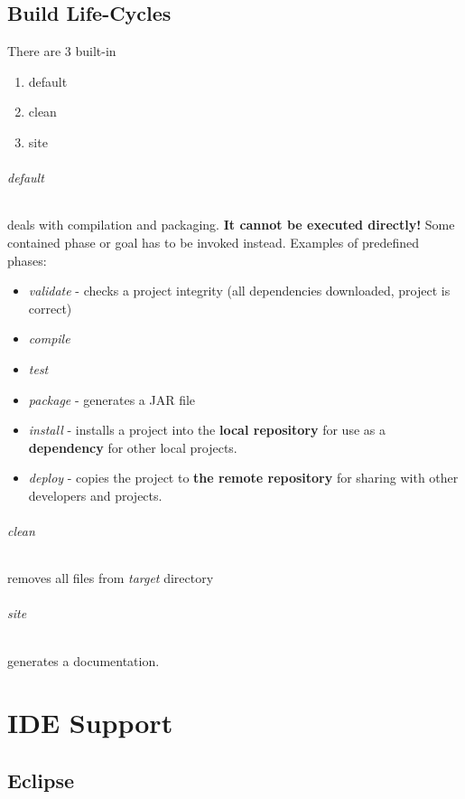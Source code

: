 \documentclass{report}
\begin{document}
\chapter{Build Life-Cycles}
There are 3 built-in
\begin{enumerate}
	\item default
	\item clean
	\item site
\end{enumerate}

\paragraph{default} deals with compilation and packaging. \textbf{It cannot be executed directly!} Some contained phase or goal has to be invoked instead. Examples of predefined phases:
\begin{itemize}
	\item \textit{validate} - checks a project integrity (all dependencies downloaded, project is correct)
	\item \textit{compile}
	\item \textit{test}
	\item \textit{package} - generates a JAR file
	\item \textit{install} - installs a project into the \textbf{local repository} for use as a \textbf{dependency} for other local projects.
	\item \textit{deploy} - copies the project to \textbf{the remote repository} for sharing with other developers and projects.
\end{itemize}

\paragraph{clean} removes all files from \textit{target} directory

\paragraph{site} generates a documentation.




\part{IDE Support}



\chapter{Eclipse}
\end{document}
